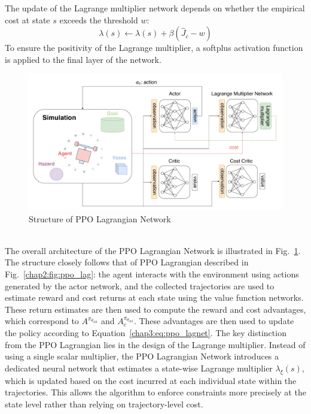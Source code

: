 The update of the Lagrange multiplier network depends on whether the empirical cost at state $s$ exceeds the threshold $w$:
\begin{equation}
  \lambda(s) \leftarrow \lambda(s) + \beta(\hat{J}_c - w)
\end{equation}
To ensure the positivity of the Lagrange multiplier, a softplus activation function is applied to the final layer of the network. 
\begin{figure}[h]
  \centering
  \includegraphics[width=1.0\textwidth]{imgs/chap3/ppo_lagnet.pdf}
  \caption{Structure of PPO Lagrangian Network}
  \label{chap3:fig:ppo_lagnet}
\end{figure} \\
The overall architecture of the PPO Lagrangian Network is illustrated in Fig.~\ref{chap3:fig:ppo_lagnet}. 
The structure closely follows that of PPO Lagrangian described in Fig.~\ref{chap2:fig:ppo_lag}: 
the agent interacts with the environment using actions generated by the actor network, and the collected trajectories are used to estimate reward and cost returns at each state using the value function networks.
These return estimates are then used to compute the reward and cost advantages, which correspond to $A^{\pi_{\theta_\text{old}}}$ and $A^{\pi_{\theta_\text{old}}}_c$.
These advantages are then used to update the policy according to Equation~\ref{chap3:eq:ppo_lagnet}.
The key distinction from the PPO Lagrangian lies in the design of the Lagrange multiplier. 
Instead of using a single scalar multiplier, the PPO Lagrangian Network introduces a dedicated neural network that estimates a state-wise Lagrange multiplier $\lambda_\xi(s)$, which is updated based on the cost incurred at each individual state within the trajectories.
This allows the algorithm to enforce constraints more precisely at the state level rather than relying on trajectory-level cost.

